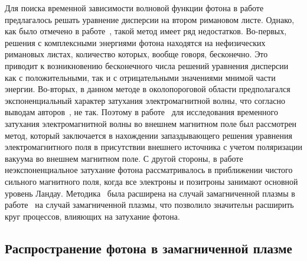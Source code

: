 Для поиска временной зависимости волновой функции фотона в 
работе~\cite{Shabad:1988} предлагалось решать уравнение дисперсии на втором 
римановом листе. Однако, как было отмечено в работе~\cite{MikhChist:2001}, 
такой метод имеет ряд недостатков. Во-первых, решения с комплексными энергиями 
фотона находятся на нефизических римановых листах, количество которых, вообще 
говоря, бесконечно. Это приводит к возникновению бесконечного числа решений 
уравнения дисперсии как с положительными, так и с отрицательными значениями 
мнимой части энергии. Во-вторых, в данном методе в околопороговой области 
предполагался экспоненциальный характер затухания электромагнитной волны, что 
согласно выводам авторов~\cite{MikhChist:2001}, не так. Поэтому 
в работе~\cite{MikhChist:2001} для исследования временного затухания 
электромагнитной волны во внешнем магнитном поле был рассмотрен метод, который 
заключается в нахождении запаздывающего решения уравнения электромагнитного 
поля в присутствии внешнего источника с учетом поляризации вакуума во внешнем 
магнитном поле. С другой стороны, в работе~\cite{MikhChist:2001} 
неэкспоненциальное затухание фотона рассматривалось в приближении чистого сильного 
магнитного поля, когда все электроны и позитроны занимают основной уровень 
Ландау. Методика~\cite{MikhChist:2001} была расширена на случай замагниченной плазмы в работе~\cite{YarkovPhotDampPAN:2022} на случай замагниченной плазмы, что позволило значительн расширить круг процессов, влияющих на затухание фотона.

\subsection{Распространение фотона в замагниченной плазме}

